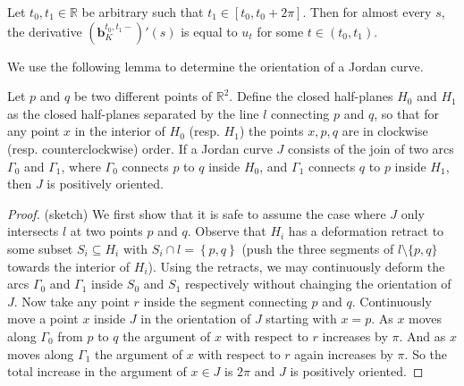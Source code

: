 \begin{corollary}

Let \(t_0, t_1 \in \mathbb{R}\) be arbitrary such that \(t_1 \in [t_0, t_0 + 2 \pi]\). Then for almost every \(s\), the derivative \(\left( \mathbf{b}_{K}^{t_0, t_1-} \right)'(s)\) is equal to \(u_t\) for some \(t \in (t_0, t_1)\).

\label{cor:param-segment-open-deriv}
\end{corollary}

We use the following lemma to determine the orientation of a Jordan curve.

\begin{lemma}

Let \(p\) and \(q\) be two different points of \(\mathbb{R}^2\). Define the closed half-planes \(H_0\) and \(H_1\) as the closed half-planes separated by the line \(l\) connecting \(p\) and \(q\), so that for any point \(x\) in the interior of \(H_0\) (resp. \(H_1\)) the points \(x, p, q\) are in clockwise (resp. counterclockwise) order. If a Jordan curve \(J\) consists of the join of two arcs \(\Gamma_0\) and \(\Gamma_1\), where \(\Gamma_0\) connects \(p\) to \(q\) inside \(H_0\), and \(\Gamma_1\) connects \(q\) to \(p\) inside \(H_1\), then \(J\) is positively oriented.

\label{lem:orientation}
\end{lemma}

\begin{proof}
(sketch) We first show that it is safe to assume the case where \(J\) only intersects \(l\) at two points \(p\) and \(q\). Observe that \(H_i\) has a deformation retract to some subset \(S_i \subseteq H_i\) with \(S_i \cap l = \left\{ p, q \right\}\) (push the three segments of \(l \setminus \{p, q\}\) towards the interior of \(H_i\)). Using the retracts, we may continuously deform the arcs \(\Gamma_0\) and \(\Gamma_1\) inside \(S_0\) and \(S_1\) respectively without chainging the orientation of \(J\). Now take any point \(r\) inside the segment connecting \(p\) and \(q\). Continuously move a point \(x\) inside \(J\) in the orientation of \(J\) starting with \(x = p\). As \(x\) moves along \(\Gamma_0\) from \(p\) to \(q\) the argument of \(x\) with respect to \(r\) increases by \(\pi\). And as \(x\) moves along \(\Gamma_1\) the argument of \(x\) with respect to \(r\) again increases by \(\pi\). So the total increase in the argument of \(x \in J\) is \(2\pi\) and \(J\) is positively oriented.
\end{proof}

